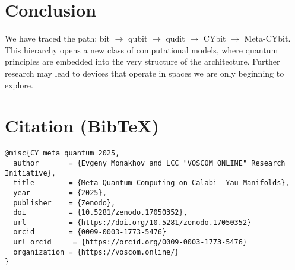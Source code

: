 \documentclass[12pt,a4paper]{article}
\begin{document}
\section*{Conclusion}
We have traced the path: bit $\to$ qubit $\to$ qudit $\to$ CYbit $\to$ Meta-CYbit.  
This hierarchy opens a new class of computational models, 
where quantum principles are embedded into the very structure of the architecture. 
Further research may lead to devices that operate in spaces 
we are only beginning to explore.

\section*{Citation (BibTeX)}
\begin{verbatim}
@misc{CY_meta_quantum_2025,
  author       = {Evgeny Monakhov and LCC "VOSCOM ONLINE" Research Initiative},
  title        = {Meta-Quantum Computing on Calabi--Yau Manifolds},
  year         = {2025},
  publisher    = {Zenodo},
  doi          = {10.5281/zenodo.17050352},
  url          = {https://doi.org/10.5281/zenodo.17050352}
  orcid		   = {0009-0003-1773-5476}
  url_orcid     = {https://orcid.org/0009-0003-1773-5476}
  organization = {https://voscom.online/}
}
\end{verbatim}
\end{document}
